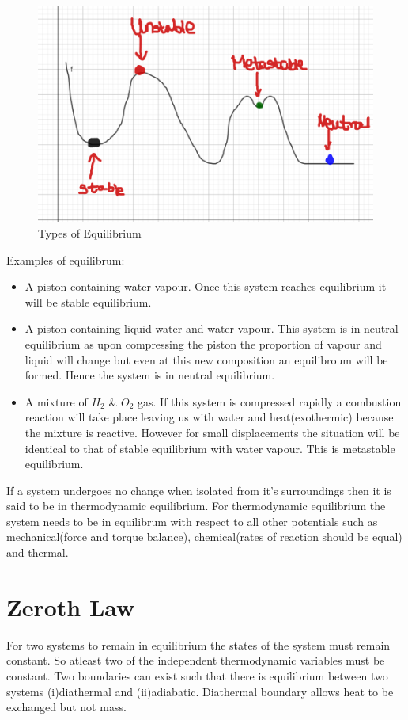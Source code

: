 \documentclass[12pt]{article}
\begin{document}
    
    \begin{figure}[h]
    	\includegraphics[scale=0.3]{resize_eqb.png}
    	\centering
    	\caption{Types of Equilibrium}
    	
    \end{figure}
    Examples of equilibrum:
   \begin{itemize}
   	\item A piston containing water vapour. Once this system reaches equilibrium it will be stable equilibrium. 
   	
   	\item A piston containing liquid water and water vapour. This system is in neutral equilibrium as upon compressing the piston the proportion of vapour and liquid will change but even at this new composition an equilibroum will be formed. Hence the system is in neutral equilibrium.
   	
   	\item A mixture of $H_2$ \& $O_2$ gas. If this system is compressed rapidly a combustion reaction will take place leaving us with water and heat(exothermic) because the mixture is reactive. However for small displacements the situation will be identical to that of stable equilibrium with water vapour. This is metastable equilibrium.
   \end{itemize}
    
    If a system undergoes no change when isolated from it's surroundings then it is said to be in thermodynamic equilibrium. For thermodynamic equilibrium the system needs to be in equilibrum with respect to all other potentials such as mechanical(force and torque balance), chemical(rates of reaction should be equal) and thermal.
    \pagebreak
\section{Zeroth Law}
    For two systems to remain in equilibrium the states of the system must remain constant. So atleast two of the independent thermodynamic variables must be constant. Two boundaries can exist such that there is equilibrium between two systems (i)diathermal and (ii)adiabatic. Diathermal boundary allows heat to be exchanged but not mass. 
    
\end{document}
